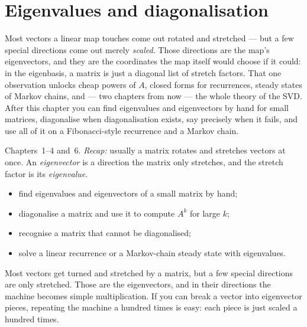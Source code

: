 \chapter{Eigenvalues and diagonalisation}\label{ch:eigen}

Most vectors a linear map touches come out rotated and stretched --- but a
few special directions come out merely \emph{scaled}. Those directions are
the map's eigenvectors, and they are the coordinates the map itself would
choose if it could: in the eigenbasis, a matrix is just a diagonal list of
stretch factors. That one observation unlocks cheap powers of $A$, closed
forms for recurrences, steady states of Markov chains, and --- two chapters
from now --- the whole theory of the SVD. After this chapter you can find
eigenvalues and eigenvectors by hand for small matrices, diagonalise when
diagonalisation exists, say precisely when it fails, and use all of it on a
Fibonacci-style recurrence and a Markov chain.

\begin{rulebox}
Chapters~1--4 and~6. \emph{Recap:} usually a matrix rotates and stretches vectors at once. An \emph{eigenvector} is a direction the matrix only stretches, and the stretch factor is its \emph{eigenvalue}.
\end{rulebox}
\begin{wins}
\begin{itemize}
\item find eigenvalues and eigenvectors of a small matrix by hand;
\item diagonalise a matrix and use it to compute $A^{k}$ for large $k$;
\item recognise a matrix that cannot be diagonalised;
\item solve a linear recurrence or a Markov-chain steady state with eigenvalues.
\end{itemize}
\end{wins}
\begin{principle}
Most vectors get turned and stretched by a matrix, but a few special directions are only stretched. Those are the eigenvectors, and in their directions the machine becomes simple multiplication. If you can break a vector into eigenvector pieces, repeating the machine a hundred times is easy: each piece is just scaled a hundred times.
\end{principle}

